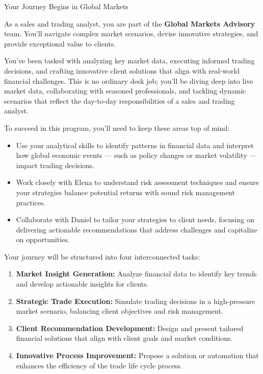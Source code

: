 \documentclass[11pt]{article}
\begin{document}
\newpage
{\fontsize{26}{30}\selectfont Your Journey Begins in Global Markets}\par\bigskip

As a sales and trading analyst, you are part of the \textbf{Global Markets
Advisory} team. You'll navigate complex market scenarios, devise innovative
strategies, and provide exceptional value to clients.

You've been tasked with analyzing key market data, executing informed trading
decisions, and crafting innovative client solutions that align with real-world
financial challenges. This is no ordinary desk job; you'll be diving deep into
live market data, collaborating with seasoned professionals, and tackling
dynamic scenarios that reflect the day-to-day responsibilities of a sales and
trading analyst.

To succeed in this program, you'll need to keep these areas top of mind:

\begin{itemize}[leftmargin=1.5em]
  \item Use your analytical skills to identify patterns in financial data and
  interpret how global economic events --- such as policy changes or market
  volatility --- impact trading decisions.
\end{itemize}

\begin{itemize}[leftmargin=1.5em]
  \item Work closely with Elena to understand risk assessment techniques and
  ensure your strategies balance potential returns with sound risk management
  practices.
\end{itemize}

\begin{itemize}[leftmargin=1.5em]
  \item Collaborate with Daniel to tailor your strategies to client needs,
  focusing on delivering actionable recommendations that address challenges
  and capitalize on opportunities.
\end{itemize}

Your journey will be structured into four interconnected tasks:
\begin{enumerate}[leftmargin=1.5em, itemsep=2pt]
  \item \textbf{Market Insight Generation:} Analyze financial data to identify
  key trends and develop actionable insights for clients.
  \item \textbf{Strategic Trade Execution:} Simulate trading decisions in a
  high-pressure market scenario, balancing client objectives and risk
  management.
  \item \textbf{Client Recommendation Development:} Design and present tailored
  financial solutions that align with client goals and market conditions.
  \item \textbf{Innovative Process Improvement:} Propose a solution or
  automation that enhances the efficiency of the trade life cycle process.
\end{enumerate}
\end{document}
